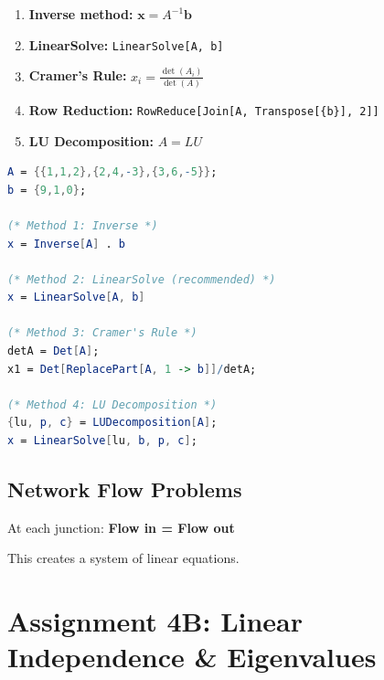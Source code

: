 \documentclass[12pt,a4paper]{article}
\begin{document}
\begin{definitionbox}[Methods for Solving \(A\mathbf{x} = \mathbf{b}\)]
    \begin{enumerate}
        \item \textbf{Inverse method:} \(\mathbf{x} = A^{-1}\mathbf{b}\)
        \item \textbf{LinearSolve:} \texttt{LinearSolve[A, b]}
        \item \textbf{Cramer's Rule:} \(x_i = \frac{\det(A_i)}{\det(A)}\)
        \item \textbf{Row Reduction:} \texttt{RowReduce[Join[A, Transpose[\{b\}], 2]]}
        \item \textbf{LU Decomposition:} \(A = LU\)
    \end{enumerate}
\end{definitionbox}

\begin{mathematicabox}
    \begin{lstlisting}[language=Mathematica, basicstyle=\ttfamily\small]
A = {{1,1,2},{2,4,-3},{3,6,-5}};
b = {9,1,0};

(* Method 1: Inverse *)
x = Inverse[A] . b

(* Method 2: LinearSolve (recommended) *)
x = LinearSolve[A, b]

(* Method 3: Cramer's Rule *)
detA = Det[A];
x1 = Det[ReplacePart[A, 1 -> b]]/detA;

(* Method 4: LU Decomposition *)
{lu, p, c} = LUDecomposition[A];
x = LinearSolve[lu, b, p, c];
    \end{lstlisting}
\end{mathematicabox}

\subsection{Network Flow Problems}

\begin{definitionbox}
    At each junction: \textbf{Flow in = Flow out}
    
    This creates a system of linear equations.
\end{definitionbox}

\section{Assignment 4B: Linear Independence \& Eigenvalues}
\end{document}
